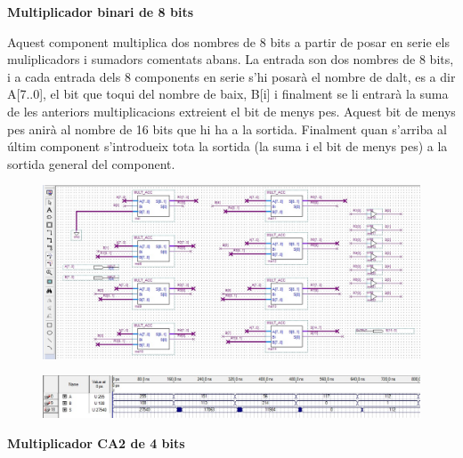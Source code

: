 \documentclass[12pt, a4papre]{article}
\begin{document}
	
	\textbf{\large{Multiplicador binari de 8 bits}}
	
	Aquest component multiplica dos nombres de 8 bits a partir de posar en serie els muliplicadors i sumadors comentats abans. La entrada son dos nombres de 8 bits, i a cada entrada dels 8 components en serie s'hi posarà el nombre de dalt, es a dir A[7..0], el bit que toqui del nombre de baix, B[i] i finalment se li entrarà la suma de les anteriors multiplicacions extreient el bit de menys pes. Aquest bit de menys pes anirà al nombre de 16 bits que hi ha a la sortida. Finalment quan s'arriba al últim component s'introdueix tota la sortida (la suma i el bit de menys pes) a la sortida general del component.
	
	\begin{center}
	\begin{figure}[H]
		\begin{center}
		\includegraphics[width=150mm]{multbin8bits.jpeg}
		\end{center}
	\end{figure}
	
	\end{center}
	
	\begin{center}
	\begin{figure}[H]
		\begin{center}
		\includegraphics[width=150mm]{multbin8bitssimul.jpeg}
		\end{center}
	\end{figure}
	
	\end{center}
	
	
	
	
	\textbf{\large{Multiplicador CA2 de 4 bits}}
	
\end{document}
